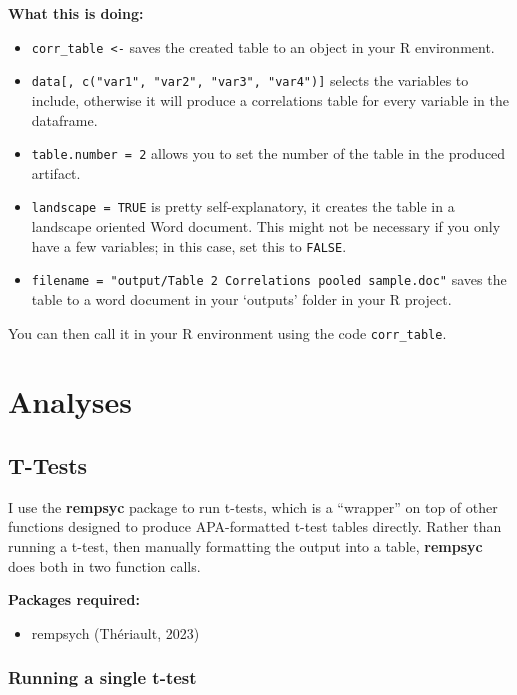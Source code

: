 \documentclass[
  letterpaper,
  DIV=11,
  numbers=noendperiod]{scrreprt}
\providecommand{\tightlist}{%
  \setlength{\itemsep}{0pt}\setlength{\parskip}{0pt}}\usepackage{longtable,booktabs,array}
\begin{document}
\textbf{What this is doing:}

\begin{itemize}
\item
  \texttt{corr\_table\ \textless{}-} saves the created table to an
  object in your R environment.
\item
  \texttt{data{[},\ c("var1",\ "var2",\ "var3",\ "var4"){]}} selects the
  variables to include, otherwise it will produce a correlations table
  for every variable in the dataframe.
\item
  \texttt{table.number\ =\ 2} allows you to set the number of the table
  in the produced artifact.
\item
  \texttt{landscape\ =\ TRUE} is pretty self-explanatory, it creates the
  table in a landscape oriented Word document. This might not be
  necessary if you only have a few variables; in this case, set this to
  \texttt{FALSE}.
\item
  \texttt{filename\ =\ "output/Table\ 2\ Correlations\ pooled\ sample.doc"}
  saves the table to a word document in your `outputs' folder in your R
  project.
\end{itemize}

You can then call it in your R environment using the code
\texttt{corr\_table}.

\part{Analyses}

\chapter{T-Tests}\label{t-tests}

I use the \textbf{rempsyc} package to run t-tests, which is a
``wrapper'' on top of other functions designed to produce APA-formatted
t-test tables directly. Rather than running a t-test, then manually
formatting the output into a table, \textbf{rempsyc} does both in two
function calls.

\textbf{Packages required:}

\begin{itemize}
\tightlist
\item
  rempsych (Thériault, 2023)
\end{itemize}

\section{Running a single t-test}\label{running-a-single-t-test}
\end{document}
